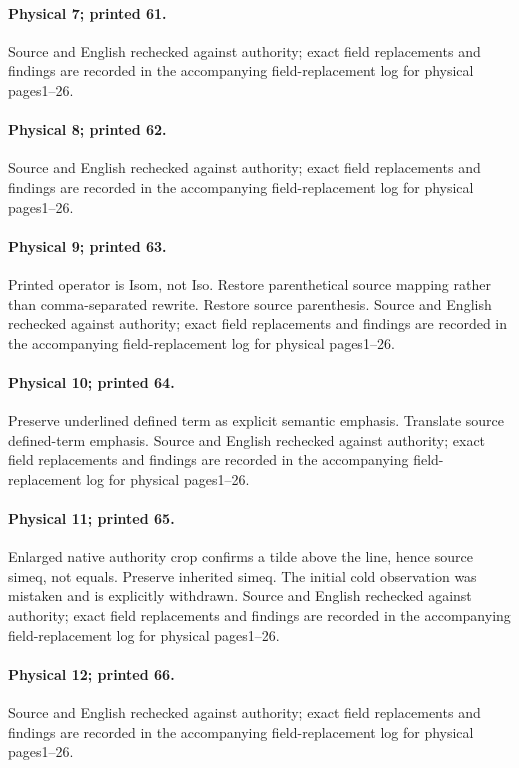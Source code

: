 \documentclass[10pt,a4paper]{article}
\begin{document}
\paragraph{Physical 7; printed 61.} Source and English rechecked against authority; exact field replacements and findings are recorded in the accompanying field-replacement log for physical pages1--26.
\paragraph{Physical 8; printed 62.} Source and English rechecked against authority; exact field replacements and findings are recorded in the accompanying field-replacement log for physical pages1--26.
\paragraph{Physical 9; printed 63.} Printed operator is Isom, not Iso. Restore parenthetical source mapping rather than comma-separated rewrite. Restore source parenthesis. Source and English rechecked against authority; exact field replacements and findings are recorded in the accompanying field-replacement log for physical pages1--26.
\paragraph{Physical 10; printed 64.} Preserve underlined defined term as explicit semantic emphasis. Translate source defined-term emphasis. Source and English rechecked against authority; exact field replacements and findings are recorded in the accompanying field-replacement log for physical pages1--26.
\paragraph{Physical 11; printed 65.} Enlarged native authority crop confirms a tilde above the line, hence source simeq, not equals. Preserve inherited simeq. The initial cold observation was mistaken and is explicitly withdrawn. Source and English rechecked against authority; exact field replacements and findings are recorded in the accompanying field-replacement log for physical pages1--26.
\paragraph{Physical 12; printed 66.} Source and English rechecked against authority; exact field replacements and findings are recorded in the accompanying field-replacement log for physical pages1--26.
\end{document}
